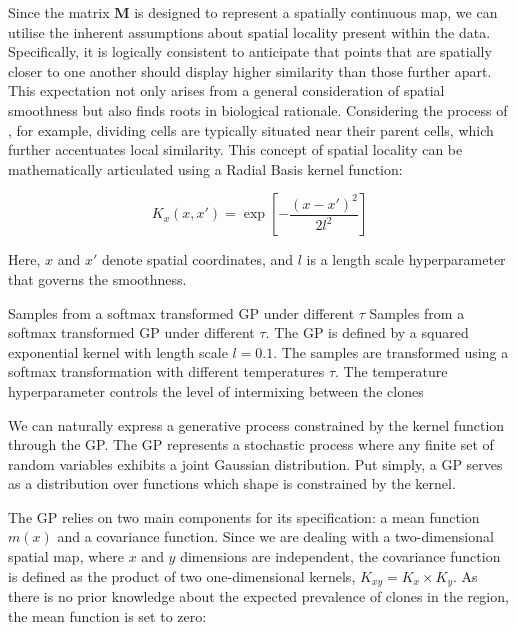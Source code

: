 Since the matrix $\mathbf{M}$ is designed to represent a spatially continuous map, we can utilise the inherent assumptions about spatial locality present within the data. Specifically, it is logically consistent to anticipate that points that are spatially closer to one another should display higher similarity than those further apart. This expectation not only arises from a general consideration of spatial smoothness but also finds roots in biological rationale. Considering the process of , for example, dividing cells are typically situated near their parent cells, which further accentuates local similarity. This concept of spatial locality can be mathematically articulated using a Radial Basis kernel function:

\begin{equation}
    K_x(x,x') = \exp\left[ -\dfrac{(x-x')^2}{2l^2}\right]
\end{equation}

Here, $x$ and $x'$ denote spatial coordinates, and $l$ is a length scale hyperparameter that governs the smoothness.

    {Samples from a softmax transformed \ac{GP} under different $\tau$}
    {Samples from a softmax transformed \ac{GP} under different $\tau$. The \ac{GP} is defined by a squared exponential kernel with length scale $l=0.1$. The samples are transformed using a softmax transformation with different temperatures $\tau$. The temperature hyperparameter controls the level of intermixing between the clones}


We can naturally express a generative process constrained by the kernel function through the \acf{GP}. The \ac{GP} represents a stochastic process where any finite set of random variables exhibits a joint Gaussian distribution. Put simply, a \ac{GP} serves as a distribution over functions which shape is constrained by the kernel. 

The \ac{GP} relies on two main components for its specification: a mean function $m(x)$ and a covariance function. Since we are dealing with a two-dimensional spatial map, where $x$ and $y$ dimensions are independent, the covariance function is defined as the product of two one-dimensional kernels, $K_{xy} = K_x \times K_y$. As there is no prior knowledge about the expected prevalence of clones in the region, the mean function is set to zero:

